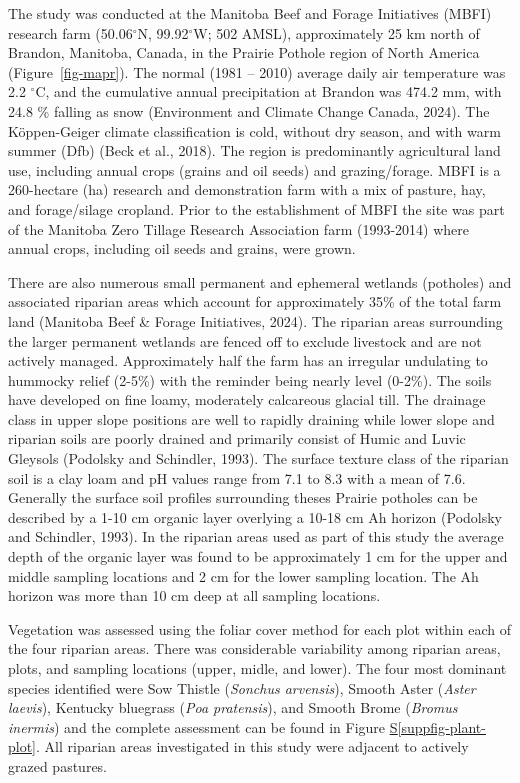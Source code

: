 \documentclass[
]{agujournal2019}
\newcommand*\quartosuppfigref[1]{Figure \hyperref[#1]{S\ref{#1}}}
\begin{document}
The study was conducted at the Manitoba Beef and Forage Initiatives
(MBFI) research farm (50.06\(^\circ\)N, 99.92\(^\circ\)W; 502 AMSL),
approximately 25 km north of Brandon, Manitoba, Canada, in the Prairie
Pothole region of North America (Figure~\ref{fig-mapr}). The normal
(1981 -- 2010) average daily air temperature was 2.2 \(^\circ\)C, and
the cumulative annual precipitation at Brandon was 474.2 mm, with 24.8
\% falling as snow (Environment and Climate Change Canada, 2024). The
Köppen-Geiger climate classification is cold, without dry season, and
with warm summer (Dfb) (Beck et al., 2018). The region is predominantly
agricultural land use, including annual crops (grains and oil seeds) and
grazing/forage. MBFI is a 260-hectare (ha) research and demonstration
farm with a mix of pasture, hay, and forage/silage cropland. Prior to
the establishment of MBFI the site was part of the Manitoba Zero Tillage
Research Association farm (1993-2014) where annual crops, including oil
seeds and grains, were grown.

There are also numerous small permanent and ephemeral wetlands
(potholes) and associated riparian areas which account for approximately
35\% of the total farm land (Manitoba Beef \& Forage Initiatives, 2024).
The riparian areas surrounding the larger permanent wetlands are fenced
off to exclude livestock and are not actively managed. Approximately
half the farm has an irregular undulating to hummocky relief (2-5\%)
with the reminder being nearly level (0-2\%). The soils have developed
on fine loamy, moderately calcareous glacial till. The drainage class in
upper slope positions are well to rapidly draining while lower slope and
riparian soils are poorly drained and primarily consist of Humic and
Luvic Gleysols (Podolsky and Schindler, 1993). The surface texture class
of the riparian soil is a clay loam and pH values range from 7.1 to 8.3
with a mean of 7.6. Generally the surface soil profiles surrounding
theses Prairie potholes can be described by a 1-10 cm organic layer
overlying a 10-18 cm Ah horizon (Podolsky and Schindler, 1993). In the
riparian areas used as part of this study the average depth of the
organic layer was found to be approximately 1 cm for the upper and
middle sampling locations and 2 cm for the lower sampling location. The
Ah horizon was more than 10 cm deep at all sampling locations.

Vegetation was assessed using the foliar cover method for each plot
within each of the four riparian areas. There was considerable
variability among riparian areas, plots, and sampling locations (upper,
midle, and lower). The four most dominant species identified were Sow
Thistle (\emph{Sonchus arvensis}), Smooth Aster (\emph{Aster laevis}),
Kentucky bluegrass (\emph{Poa pratensis}), and Smooth Brome
(\emph{Bromus inermis}) and the complete assessment can be found in
\quartosuppfigref{suppfig-plant-plot}. All riparian areas investigated
in this study were adjacent to actively grazed pastures.
\end{document}
